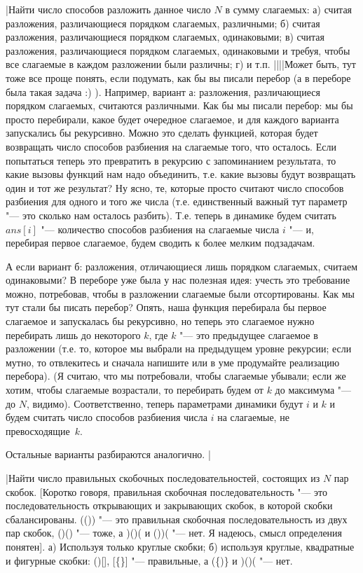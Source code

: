 
\task|Найти число способов разложить данное число $N$ в сумму слагаемых: а) 
считая разложения, различающиеся порядком слагаемых, различными; б) считая разложения, 
различающиеся порядком слагаемых, одинаковыми; в) считая разложения, 
различающиеся порядком слагаемых, одинаковыми и требуя, чтобы все слагаемые 
в каждом разложении были различны; г) и т.п.
||||Может быть, тут тоже все проще понять, если подумать, как бы вы писали перебор (а в переборе была такая задача :) ). Например, вариант а: разложения, различающиеся порядком слагаемых, считаются различными. Как бы мы писали перебор: мы бы просто перебирали, какое будет очередное слагаемое, и для каждого варианта запускались бы рекурсивно. Можно это сделать функцией, которая будет возвращать число способов разбиения на слагаемые того, что осталось. Если попытаться теперь это превратить в рекурсию с запоминанием результата, то какие вызовы функций нам надо объединить, т.е. какие вызовы будут возвращать один и тот же результат? Ну ясно, те, которые просто считают число способов разбиения для одного и того же числа (т.е. единственный важный тут параметр "--- это сколько нам осталось разбить). Т.е. теперь в динамике будем считать $ans[i]$ "--- количество способов разбиения на слагаемые числа $i$ "--- и, перебирая первое слагаемое, будем сводить к более мелким подзадачам.

А если вариант б: разложения, отличающиеся лишь порядком слагаемых, считаем одинаковыми? В переборе уже была у нас полезная идея: учесть это требование можно, потребовав, чтобы в разложении слагаемые были отсортированы. Как мы тут стали бы писать перебор? Опять, наша функция перебирала бы первое слагаемое и запускалась бы рекурсивно, но теперь это слагаемое нужно перебирать лишь до некоторого $k$, где $k$ "--- это предыдущее слагаемое в разложении (т.е. то, которое мы выбрали на предыдущем уровне рекурсии; если мутно, то отвлекитесь и сначала напишите или в уме продумайте реализацию перебора). (Я считаю, что мы потребовали, чтобы слагаемые убывали; если же хотим, чтобы слагаемые возрастали, то перебирать будем от $k$ до максимума "--- до $N$, видимо). Соответственно, теперь параметрами динамики будут $i$ и $k$ и будем считать число способов разбиения числа $i$ на слагаемые, не превосходящие~$k$.

Остальные варианты разбираются аналогично.
|

\task|Найти число правильных скобочных последовательностей, состоящих из $N$ пар скобок. 
[Коротко говоря, правильная скобочная последовательность "--- это последовательность открывающих и 
закрывающих скобок, в которой скобки сбалансированы. (()) "--- это правильная скобочная 
последовательность из двух пар скобок, ()() "--- тоже, а )()( и ())( "--- нет. Я надеюсь, смысл 
определения понятен]. а) Используя только круглые скобки; б) используя круглые, квадратные и 
фигурные скобки: ()[], [\{\}] "--- правильные, а (\{)\} и )()( "--- нет.


